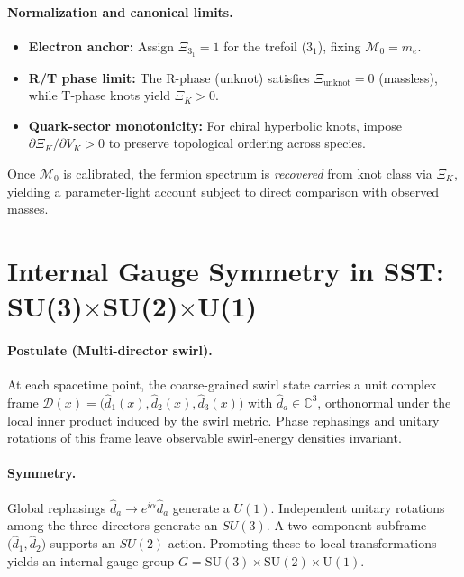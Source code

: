 \documentclass[10pt,reprint,aps,onecolumn,nofootinbib]{revtex4-2}
\newcommand{\swirlarrow}{%
    \mathchoice{\mkern-2mu\scriptstyle\boldsymbol{\circlearrowleft}}%
    {\mkern-2mu\scriptscriptstyle\boldsymbol{\circlearrowleft}}%
}
\newcommand{\vswirl}{\mathbf{v}_{\swirlarrow}}
\newcommand{\rhoE}{\rho_{\!E}}                           %
\newcommand{\rc}{r_c}                                    %
\begin{document}
        \paragraph{Normalization and canonical limits.}
            \begin{itemize}
            \item \textbf{Electron anchor:} Assign $\Xi_{3_1}=1$ for the trefoil ($3_1$), fixing $\mathcal{M}_0=m_e$.
            \item \textbf{R/T phase limit:} The R-phase (unknot) satisfies $\Xi_{\mathrm{unknot}}=0$ (massless), while T-phase knots yield $\Xi_K>0$.
            \item \textbf{Quark-sector monotonicity:} For chiral hyperbolic knots, impose $\partial \Xi_K/\partial V_K>0$ to preserve topological ordering across species.
            \end{itemize}
            Once $\mathcal{M}_0$ is calibrated, the fermion spectrum is \emph{recovered} from knot class via $\Xi_K$, yielding a parameter-light account subject to direct comparison with observed masses.

            \newcommand{\vswirl}{\mathbf{v}_{\!\boldsymbol{\circlearrowleft}}}
            \newcommand{\rhoF}{\rho_{\!f}}
            \newcommand{\rhoE}{\rho_{\!E}}
            \newcommand{\rhoM}{\rho_{\!m}}
            \newcommand{\rc}{r_c}

\section{Internal Gauge Symmetry in SST: SU(3)\texorpdfstring{$\times$}{×}SU(2)\texorpdfstring{$\times$}{×}U(1)}
\label{sec:SST-gauge}

\paragraph{Postulate (Multi-director swirl).}
    At each spacetime point, the coarse-grained swirl state carries a unit complex frame
    $\mathcal{D}(x) = \big( \hat{d}_1(x), \hat{d}_2(x), \hat{d}_3(x) \big)$
    with $\hat{d}_a \in \mathbb{C}^3$, orthonormal under the local inner product induced by the swirl metric.
    Phase rephasings and unitary rotations of this frame leave observable swirl-energy densities invariant.

\paragraph{Symmetry.}
    Global rephasings $\hat{d}_a \!\to\! e^{i\alpha}\hat{d}_a$ generate a $U(1)$.
    Independent unitary rotations among the three directors generate an $SU(3)$.
    A two-component subframe $\big(\hat{d}_1,\hat{d}_2\big)$ supports an $SU(2)$ action.
    Promoting these to local transformations yields an internal gauge group
    $G=\mathrm{SU(3)}\times\mathrm{SU(2)}\times\mathrm{U(1)}$.
\end{document}
